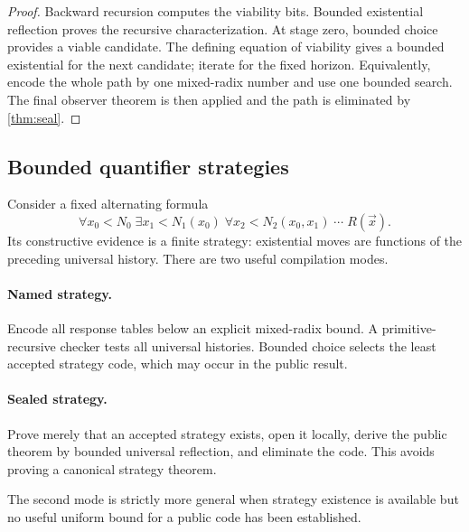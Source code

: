 \begin{proof}
Backward recursion computes the viability bits.  Bounded existential reflection proves the recursive
characterization.  At stage zero, bounded choice provides a viable candidate.  The defining equation
of viability gives a bounded existential for the next candidate; iterate for the fixed horizon.
Equivalently, encode the whole path by one mixed-radix number and use one bounded search.  The final
observer theorem is then applied and the path is eliminated by \cref{thm:seal}.
\end{proof}

\subsection{Bounded quantifier strategies}

Consider a fixed alternating formula
\[
 \forall x_0<N_0\;\exists x_1<N_1(x_0)\;\forall x_2<N_2(x_0,x_1)\;\cdots\;R(\vec x).
\]
Its constructive evidence is a finite strategy: existential moves are functions of the preceding
universal history.  There are two useful compilation modes.

\paragraph{Named strategy.}
Encode all response tables below an explicit mixed-radix bound.  A primitive-recursive checker tests
all universal histories.  Bounded choice selects the least accepted strategy code, which may occur in
the public result.

\paragraph{Sealed strategy.}
Prove merely that an accepted strategy exists, open it locally, derive the public theorem by bounded
universal reflection, and eliminate the code.  This avoids proving a canonical strategy theorem.

The second mode is strictly more general when strategy existence is available but no useful uniform
bound for a public code has been established.
